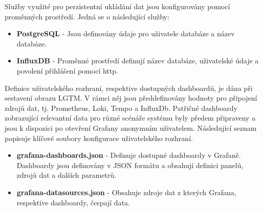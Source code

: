 Služby využité pro perzistentní ukládání dat jsou konfigurovány pomocí proměnných prostředí. Jedná se o následující služby:

\begin{itemize}
  \item \textbf{PostgreSQL} - Jsou definovány údaje pro uživatele databáze a název databáze.
  \item \textbf{InfluxDB} - Proměnné prostředí definují název databáze, uživatelské údaje a povolení přihlášení pomocí http.
\end{itemize}

Definice uživatelského rozhraní, respektive dostupných dashboardů, je dána při sestavení obrazu LGTM. V rámci něj jsou předdefinovány hodnoty pro připojení zdrojů dat, tj. Prometheus, Loki, Tempo a InfluxDb. Patřičné dashboardy zobrazující relevantní data pro různé scénáře systému byly předem připraveny a jsou k dispozici po otevření Grafany anonymním uživatelem. Následující seznam popisuje klíčové soubory konfigurace uživatelského rozhraní.

\begin{itemize}
  \item \textbf{grafana-dashboards.json} - Definuje dostupné dashboardy v Grafaně. Dashboardy jsou definovány v JSON formátu a obsahují definici panelů, zdrojů dat a dalších parametrů.
  \item \textbf{grafana-datasources.json} - Obsahuje  zdroje dat z kterých Grafana, respektive dashboardy, čerpají data.
\end{itemize}